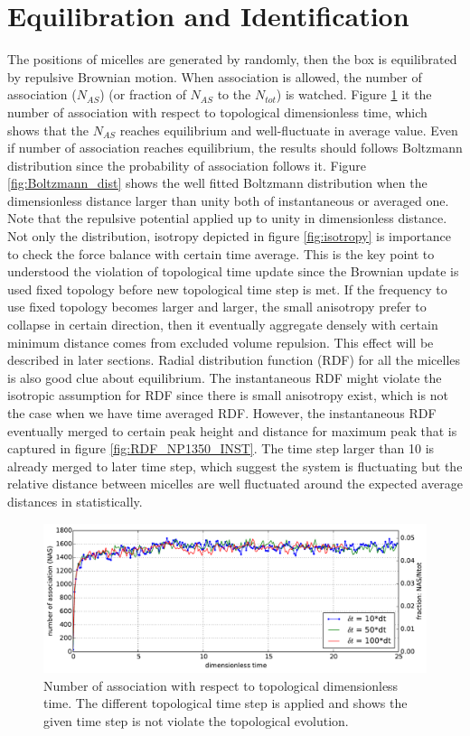 \documentclass[10pt, a4paper]{article}
\begin{document}
\section{Equilibration and Identification}
The positions of micelles are generated by randomly, then the box is equilibrated by repulsive Brownian motion. When association is allowed, the number of association ($N_{AS}$) (or fraction of $N_{AS}$ to the $N_{tot}$) is watched. Figure \ref{fig:NP1350_NAS} it the number of association with respect to topological dimensionless time, which shows that the $N_{AS}$ reaches equilibrium and well-fluctuate in average value. Even if number of association reaches equilibrium, the results should follows Boltzmann distribution since the probability of association follows it. Figure \ref{fig:Boltzmann_dist} shows the well fitted Boltzmann distribution when the dimensionless distance larger than unity both of instantaneous or averaged one. Note that the repulsive potential applied up to unity in dimensionless distance. Not only the distribution, isotropy depicted in figure \ref{fig:isotropy} is importance to check the force balance with certain time average. This is the key point to understood the violation of topological time update since the Brownian update is used fixed topology before new topological time step is met. If the frequency to use fixed topology becomes larger and larger, the small anisotropy prefer to collapse in certain direction, then it eventually aggregate densely with certain minimum distance comes from excluded volume repulsion. This effect will be described in later sections. Radial distribution function (RDF) for all the micelles is also good clue about equilibrium. The instantaneous RDF might violate the isotropic assumption for RDF since there is small anisotropy exist, which is not the case when we have time averaged RDF. However, the instantaneous RDF eventually merged to certain peak height and distance for maximum peak that is captured in figure \ref{fig:RDF_NP1350_INST}. The time step larger than 10 is already merged to later time step, which suggest the system is fluctuating but the relative distance between micelles are well fluctuated around the expected average distances in statistically.

\begin{figure}
  \centering
  \includegraphics[width=\textwidth]{figures/NP1350_delta_t_test.pdf}
  \caption{Number of association with respect to topological dimensionless time. The different topological time step is applied and shows the given time step is not violate the topological evolution.}
  \label{fig:NP1350_NAS}
\end{figure}
\end{document}
